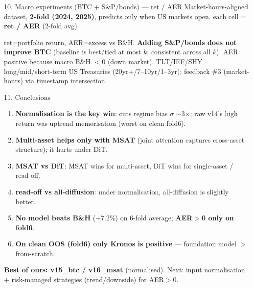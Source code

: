 \documentclass[aspectratio=169]{beamer}
\begin{document}
\begin{frame}{10. Macro experiments (BTC + S\&P/bonds) --- ret / AER}
\small Market-hours-aligned dataset, \textbf{2-fold (2024, 2025)}, predicts only when US markets open. each cell = \textbf{ret / AER} (2-fold avg)\\[.5ex]
\begin{center}\end{center}
\footnotesize ret=portfolio return, AER=excess vs B\&H. \textbf{Adding S\&P/bonds does not improve BTC} (baseline is best/tied at most $k$; consistent across all $k$). AER positive because macro B\&H $<0$ (down market). TLT/IEF/SHY = long/mid/short-term US Treasuries (20yr+/7--10yr/1--3yr); feedback \#3 (market-hours) via timestamp intersection.\end{frame}
\begin{frame}{11. Conclusions}
\small
\begin{enumerate}
\item \textbf{Normalisation is the key win}: cuts regime bias $\sigma$ $\sim$3$\times$; raw v14's high return was uptrend memorisation (worst on clean fold6).
\item \textbf{Multi-asset helps only with MSAT} (joint attention captures cross-asset structure); it hurts under DiT.
\item \textbf{MSAT vs DiT}: MSAT wins for multi-asset, DiT wins for single-asset / read-off.
\item \textbf{read-off vs all-diffusion}: under normalisation, all-diffusion is slightly better.
\item \textbf{No model beats B\&H} (+7.2\%) on 6-fold average; \textbf{AER$>$0 only on fold6}.
\item \textbf{On clean OOS (fold6) only Kronos is positive} --- foundation model $>$ from-scratch.
\end{enumerate}
\vspace{.3ex}
\textbf{Best of ours: v15\_btc / v16\_msat} (normalised). Next: input normalisation + risk-managed strategies (trend/downside) for AER$>$0.
\end{frame}
\end{document}

